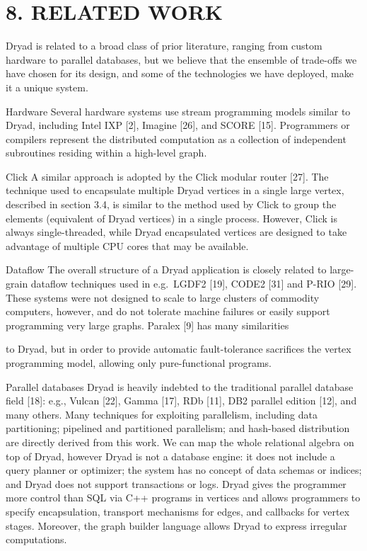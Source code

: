 \documentclass[
]{article}
\begin{document}
\section{8. RELATED WORK}\label{related-work}

Dryad is related to a broad class of prior literature, ranging from
custom hardware to parallel databases, but we believe that the ensemble
of trade-offs we have chosen for its design, and some of the
technologies we have deployed, make it a unique system.

Hardware Several hardware systems use stream programming models similar
to Dryad, including Intel IXP {[}2{]}, Imagine {[}26{]}, and SCORE
{[}15{]}. Programmers or compilers represent the distributed computation
as a collection of independent subroutines residing within a high-level
graph.

Click A similar approach is adopted by the Click modular router
{[}27{]}. The technique used to encapsulate multiple Dryad vertices in a
single large vertex, described in section 3.4, is similar to the method
used by Click to group the elements (equivalent of Dryad vertices) in a
single process. However, Click is always single-threaded, while Dryad
encapsulated vertices are designed to take advantage of multiple CPU
cores that may be available.

Dataflow The overall structure of a Dryad application is closely related
to large-grain dataflow techniques used in e.g.~LGDF2 {[}19{]}, CODE2
{[}31{]} and P-RIO {[}29{]}. These systems were not designed to scale to
large clusters of commodity computers, however, and do not tolerate
machine failures or easily support programming very large graphs.
Paralex {[}9{]} has many similarities

to Dryad, but in order to provide automatic fault-tolerance sacrifices
the vertex programming model, allowing only pure-functional programs.

Parallel databases Dryad is heavily indebted to the traditional parallel
database field {[}18{]}: e.g., Vulcan {[}22{]}, Gamma {[}17{]}, RDb
{[}11{]}, DB2 parallel edition {[}12{]}, and many others. Many
techniques for exploiting parallelism, including data partitioning;
pipelined and partitioned parallelism; and hash-based distribution are
directly derived from this work. We can map the whole relational algebra
on top of Dryad, however Dryad is not a database engine: it does not
include a query planner or optimizer; the system has no concept of data
schemas or indices; and Dryad does not support transactions or logs.
Dryad gives the programmer more control than SQL via C++ programs in
vertices and allows programmers to specify encapsulation, transport
mechanisms for edges, and callbacks for vertex stages. Moreover, the
graph builder language allows Dryad to express irregular computations.
\end{document}
